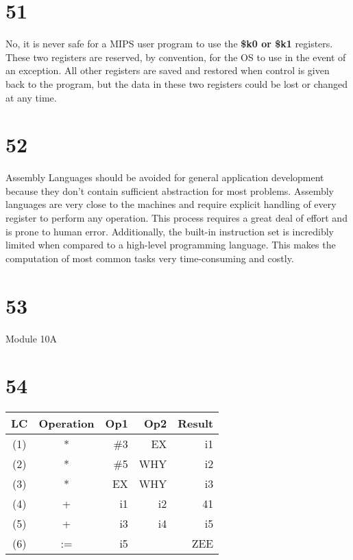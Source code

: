 \documentclass[a4paper,11pt]{article}
\begin{document}

\section*{51}
No, it is never safe for a MIPS user program to use the {\bf \$k0 or \$k1} registers.  These two registers are reserved, by convention, for the OS to use in the event of an exception.  All other registers are saved and restored when control is given back to the program, but the data in these two registers could be lost or changed at any time.


\section*{52}
Assembly Languages should be avoided for general application development because they don't contain sufficient abstraction for most problems.  Assembly languages are very close to the machines and require explicit handling of every register to perform any operation.  This process requires a great deal of effort and is prone to human error.  Additionally, the built-in instruction set is incredibly limited when compared to a high-level programming language.  This makes the computation of most common tasks very time-consuming and costly.



\section*{53}
Module 10A


\section*{54}

\begin{tabular}{ | c | c | r | r | r |}
  \hline
    LC & Operation & Op1 & Op2 & Result  \\ \hline
    (1) & * & \#3 & EX & i1 \\ \hline
    (2) & * & \#5 & WHY & i2 \\ \hline
    (3) & * & EX & WHY & i3 \\ \hline
    (4) & + & i1 & i2 & 41 \\ \hline
    (5) & + & i3 & i4 & i5 \\ \hline
    (6) & := & i5 &  & ZEE \\ \hline
\end{tabular}
\end{document}

